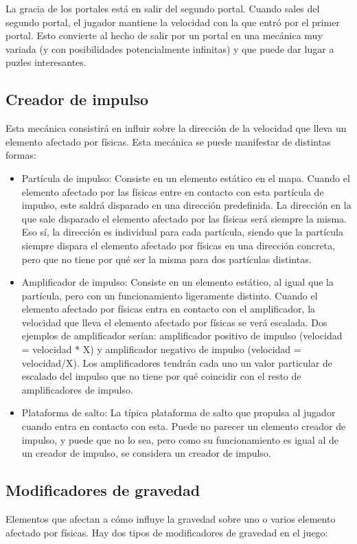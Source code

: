 La gracia de los portales está en salir del segundo portal. Cuando sales del segundo portal, el jugador mantiene la velocidad con la que entró por el primer portal. Esto convierte al hecho de salir por un portal en una mecánica muy variada (y con posibilidades potencialmente infinitas) y que puede dar lugar a puzles interesantes.

\subsection{Creador de impulso}
Esta mecánica consistirá en influir sobre la dirección de la velocidad que lleva un elemento afectado por físicas. Esta mecánica se puede manifestar de distintas formas:
\begin{itemize}
\item
Partícula de impulso: Consiste en un elemento estático en el mapa. Cuando el elemento afectado por las físicas entre en contacto con esta partícula de impulso, este saldrá disparado en una dirección predefinida. La dirección en la que sale disparado el elemento afectado por las físicas será siempre la misma. Eso sí, la dirección es individual para cada partícula, siendo que la partícula siempre dispara el elemento afectado por físicas en una dirección concreta, pero que no tiene por qué ser la misma para dos partículas distintas.
\item
Amplificador de impulso: Consiste en un elemento estático, al igual que la partícula, pero con un funcionamiento ligeramente distinto. Cuando el elemento afectado por físicas entra en contacto con el amplificador, la velocidad que lleva el elemento afectado por físicas se verá escalada. Dos ejemplos de amplificador serían: amplificador positivo de impulso (velocidad = velocidad * X) y amplificador negativo de impulso (velocidad = velocidad/X). Los amplificadores tendrán cada uno un valor particular de escalado del impulso que no tiene por qué coincidir con el resto de amplificadores de impulso.
\item
Plataforma de salto: La típica plataforma de salto que propulsa al jugador cuando entra en contacto con esta. Puede no parecer un elemento creador de impulso, y puede que no lo sea, pero como su funcionamiento es igual al de un creador de impulso, se considera un creador de impulso.
\end{itemize}

\subsection{Modificadores de gravedad}
Elementos que afectan a cómo influye la gravedad sobre uno o varios elemento afectado por físicas. Hay dos tipos de modificadores de gravedad en el juego:

